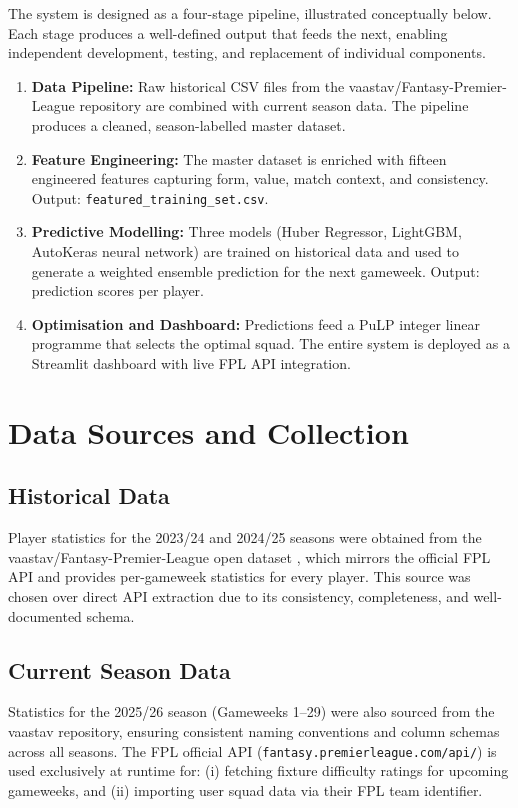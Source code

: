 \documentclass[11pt,english,listoffigures,listoftables]{tfgetsinf}
\begin{document}
The system is designed as a four-stage pipeline, illustrated conceptually below. Each stage produces a well-defined output that feeds the next, enabling independent development, testing, and replacement of individual components.

\begin{enumerate}
    \item \textbf{Data Pipeline:} Raw historical CSV files from the vaastav/Fantasy-Premier-League repository \cite{vaastav} are combined with current season data. The pipeline produces a cleaned, season-labelled master dataset.
    \item \textbf{Feature Engineering:} The master dataset is enriched with fifteen engineered features capturing form, value, match context, and consistency. Output: \texttt{featured\_training\_set.csv}.
    \item \textbf{Predictive Modelling:} Three models (Huber Regressor, LightGBM, AutoKeras neural network) are trained on historical data and used to generate a weighted ensemble prediction for the next gameweek. Output: prediction scores per player.
    \item \textbf{Optimisation and Dashboard:} Predictions feed a PuLP integer linear programme that selects the optimal squad. The entire system is deployed as a Streamlit dashboard with live FPL API integration.
\end{enumerate}

\section{Data Sources and Collection}

\subsection{Historical Data}

Player statistics for the 2023/24 and 2024/25 seasons were obtained from the vaastav/Fantasy-Premier-League open dataset \cite{vaastav}, which mirrors the official FPL API and provides per-gameweek statistics for every player. This source was chosen over direct API extraction due to its consistency, completeness, and well-documented schema.

\subsection{Current Season Data}

Statistics for the 2025/26 season (Gameweeks 1--29) were also sourced from the vaastav repository, ensuring consistent naming conventions and column schemas across all seasons. The FPL official API (\texttt{fantasy.premierleague.com/api/}) is used exclusively at runtime for: (i) fetching fixture difficulty ratings for upcoming gameweeks, and (ii) importing user squad data via their FPL team identifier.
\end{document}
